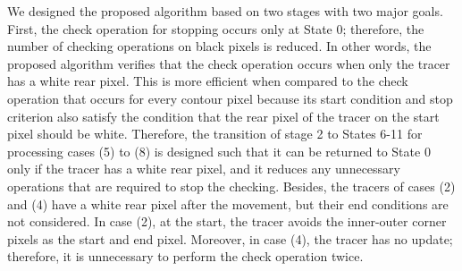 
We designed the proposed algorithm based on two stages with two major goals. First, the check operation for stopping occurs only at State 0; therefore, the number of checking operations on black pixels is reduced. In other words, the proposed algorithm verifies that the check operation occurs when only the tracer has a white rear pixel. This is more efficient when compared to the check operation that occurs for every contour pixel because its start condition and stop criterion also satisfy the condition that the rear pixel of the tracer on the start pixel should be white. Therefore, the transition of stage 2 to States 6-11 for processing cases (5) to (8) is designed such that it can be returned to State 0 only if the tracer has a white rear pixel, and it reduces any unnecessary operations that are required to stop the checking. Besides, the tracers of cases (2) and (4) have a white rear pixel after the movement, but their end conditions are not considered. In case (2), at the start, the tracer avoids the inner-outer corner pixels as the start and end pixel. Moreover, in case (4), the tracer has no update; therefore, it is unnecessary to perform the check operation twice. 

